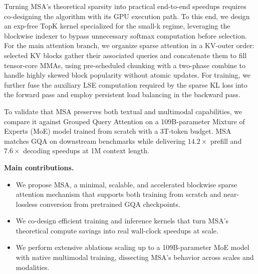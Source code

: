 Turning MSA's theoretical sparsity into practical end-to-end speedups requires co-designing the algorithm with its GPU execution path. To this end, we design an exp-free TopK kernel specialized for the small-k regime, leveraging the blockwise indexer to bypass unnecessary softmax computation before selection. For the main attention branch, we organize sparse attention in a KV-outer order: selected KV blocks gather their associated queries and concatenate them to fill tensor-core MMAs, using pre-scheduled chunking with a two-phase combine to handle highly skewed block popularity without atomic updates. For training, we further fuse the auxiliary LSE computation required by the sparse KL loss into the forward pass and employ persistent load balancing in the backward pass. 

To validate that MSA preserves both textual and multimodal capabilities, we compare it against Grouped Query Attention on a 109B-parameter Mixture of Experts (MoE) model trained from scratch with a 3T-token budget. MSA matches GQA on downstream benchmarks while delivering $14.2\times$ prefill and $7.6\times$ decoding speedups at 1M context length.



\noindent \textbf{Main contributions.} 
\begin{itemize}[itemsep=6pt]
    \item We propose MSA, a minimal, scalable, and accelerated blockwise sparse attention mechanism that supports both training from scratch and near-lossless conversion from pretrained GQA checkpoints.

    \item We co-design efficient training and inference kernels that turn MSA's theoretical compute savings into real wall-clock speedups at scale.

    \item We perform extensive ablations scaling up to a 109B-parameter MoE model with native multimodal training, dissecting MSA's behavior across scales and modalities.
\end{itemize}

